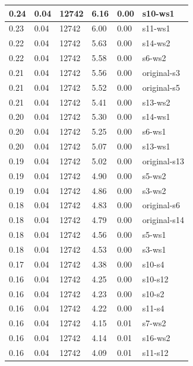 \begin{table}
{\begin{tabular}{|l|l|l|l|l|l|}
0.24        & 0.04 & 12742 & 6.16    & 0.00    & s10-ws1      \\ \hline
0.23        & 0.04 & 12742 & 6.00    & 0.00    & s11-ws1      \\ \hline
0.22        & 0.04 & 12742 & 5.63    & 0.00    & s14-ws2      \\ \hline
0.22        & 0.04 & 12742 & 5.58    & 0.00    & s6-ws2       \\ \hline
0.21        & 0.04 & 12742 & 5.56    & 0.00    & original-s3  \\ \hline
0.21        & 0.04 & 12742 & 5.52    & 0.00    & original-s5  \\ \hline
0.21        & 0.04 & 12742 & 5.41    & 0.00    & s13-ws2      \\ \hline
0.20        & 0.04 & 12742 & 5.30    & 0.00    & s14-ws1      \\ \hline
0.20        & 0.04 & 12742 & 5.25    & 0.00    & s6-ws1       \\ \hline
0.20        & 0.04 & 12742 & 5.07    & 0.00    & s13-ws1      \\ \hline
0.19        & 0.04 & 12742 & 5.02    & 0.00    & original-s13 \\ \hline
0.19        & 0.04 & 12742 & 4.90    & 0.00    & s5-ws2       \\ \hline
0.19        & 0.04 & 12742 & 4.86    & 0.00    & s3-ws2       \\ \hline
0.18        & 0.04 & 12742 & 4.83    & 0.00    & original-s6  \\ \hline
0.18        & 0.04 & 12742 & 4.79    & 0.00    & original-s14 \\ \hline
0.18        & 0.04 & 12742 & 4.56    & 0.00    & s5-ws1       \\ \hline
0.18        & 0.04 & 12742 & 4.53    & 0.00    & s3-ws1       \\ \hline
0.17        & 0.04 & 12742 & 4.38    & 0.00    & s10-s4       \\ \hline
0.16        & 0.04 & 12742 & 4.25    & 0.00    & s10-s12      \\ \hline
0.16        & 0.04 & 12742 & 4.23    & 0.00    & s10-s2       \\ \hline
0.16        & 0.04 & 12742 & 4.22    & 0.00    & s11-s4       \\ \hline
0.16        & 0.04 & 12742 & 4.15    & 0.01    & s7-ws2       \\ \hline
0.16        & 0.04 & 12742 & 4.14    & 0.01    & s16-ws2      \\ \hline
0.16        & 0.04 & 12742 & 4.09    & 0.01    & s11-s12      \\ \hline

\end{tabular}}
\end{table}
